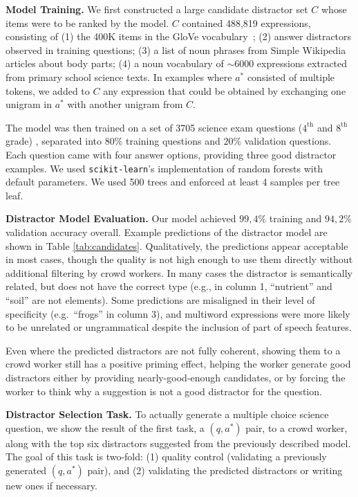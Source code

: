 \textbf{Model Training.} We first constructed a large candidate distractor set $C$ whose items were to be ranked by the model. $C$ contained 488,819 expressions, consisting of (1) the 400K items in the GloVe vocabulary~\cite{pennington2014glove}; (2) answer distractors observed in training questions; (3) a list of noun phrases from Simple Wikipedia articles about body parts; (4) a noun vocabulary of $\mathtt{\sim}$6000 expressions extracted from primary school science texts. In examples where $a^*$ consisted of multiple tokens, we added to $C$ any expression that could be obtained by exchanging one unigram in $a^*$ with another unigram from $C$. 

The model was then trained on a set of 3705 science exam questions ($4^{\text{th}}$ and $8^{\text{th}}$ grade) , separated into $80\%$ training questions and $20\%$ validation questions. Each question came with four answer options, providing three good distractor examples.  We used \texttt{\small{scikit-learn}}'s
implementation of random forests with default parameters.  We used 500 trees and enforced at least 4 samples per tree leaf.

\textbf{Distractor Model Evaluation.}  Our model achieved $99,4\%$ training and $94,2\%$ validation accuracy overall. Example predictions of the distractor model are shown in Table \ref{tab:candidates}. Qualitatively, the predictions appear acceptable in most cases, though the quality is not high enough to use them directly without additional filtering by crowd workers.  In many cases the distractor is semantically related, but does not have the correct type (e.g., in column 1, ``nutrient'' and ``soil'' are not elements). Some predictions are misaligned in their level of specificity (e.g.~``frogs'' in column 3), and multiword expressions were more likely to be unrelated or ungrammatical despite the inclusion of part of speech features.

Even where the predicted distractors are not fully coherent, showing them to a crowd worker still has a positive priming effect, helping the worker generate good distractors either by providing nearly-good-enough candidates, or by forcing the worker to think why a suggestion is not a good distractor for the question.

\textbf{Distractor Selection Task.} To actually generate a multiple choice science question, we show the result of the first task, a $(q, a^*)$ pair, to a crowd worker, along with the top six distractors suggested from the previously described model. The goal of this task is two-fold: (1) quality control (validating a previously generated $(q, a^*)$ pair), and (2) validating the predicted distractors or writing new ones if necessary.

